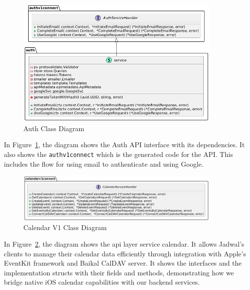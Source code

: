 \begin{figure}[!h]
    \centering
    \includegraphics[width=0.9\textwidth]{images/docs/diagrams/class/class-diagram/auth.png}
    \caption{Auth Class Diagram}
    \label{fig:auth-class-diagram}
\end{figure}

In Figure~\ref{fig:auth-class-diagram}, the diagram shows the Auth API interface with its dependencies.
It also shows the \texttt{authv1connect} which is the generated code for the API\@.
This includes the flow for using email to authenticate and using Google.



\begin{figure}[!h]
    \centering
    \includegraphics[width=0.9\textwidth]{images/docs/diagrams/class/class-diagram/calendarv1.png}
    \caption{Calendar V1 Class Diagram}
    \label{fig:calendar-v1-class-diagram}
\end{figure}

In Figure~\ref{fig:calendar-v1-class-diagram}, the diagram shows the api layer service calendar.
It allows Jadwal's clients to manage their calendar data efficiently through integration with Apple's EventKit framework and Baikal CalDAV server.
It shows the interfaces and the implementation structs with their fields and methods, demonstrating how we bridge native iOS calendar capabilities with our backend services.



